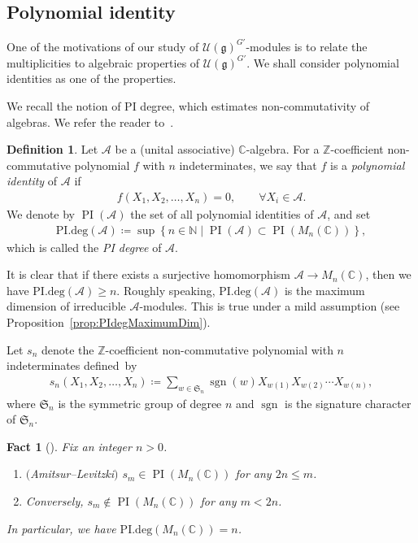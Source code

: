 \documentclass[10pt,a4paper]{amsart}
\numberwithin{equation}{section}
\newtheorem{Fact}[Theorem]{Fact}
\theoremstyle{definition}
\newtheorem{Definition}[Theorem]{Definition}
\newcommand{\set}[1]{\left\{#1 \right\}}
\newcommand{\BasicRing}[1]{\mathbb{#1}}
\newcommand{\ZZ}{\BasicRing{Z}}
\newcommand{\NN}{\BasicRing{N}}
\newcommand{\CC}{\BasicRing{C}}
\newcommand{\PIdeg}{\mathrm{PI.deg}}
\newcommand{\alg}[1]{\mathcal{#1}}
\newcommand{\lieC}[1]{\mathfrak{#1}}
\newcommand{\univ}[1]{\mathcal{U}(\lieC{#1})}
\newcommand{\Sn}{\mathfrak{S}}
\DeclareMathOperator{\PI}{PI}
\DeclareMathOperator{\sgn}{sgn}
\begin{document}
\subsection{Polynomial identity}

One of the motivations of our study of $\univ{g}^{G'}$-modules is to relate the multiplicities to algebraic properties of $\univ{g}^{G'}$.
We shall consider polynomial identities as one of the properties.

We recall the notion of PI degree, which estimates non-commutativity of algebras.
We refer the reader to~\cite[Section~13]{McRo01_noncommutative}.

\begin{Definition}%
	Let $\alg{A}$ be a (unital associative) $\CC$-algebra.
	For a $\ZZ$-coefficient non-commutative polynomial $f$ with $n$ indeterminates, we say that $f$ is a \emph{polynomial identity} of $\alg{A}$ if
	\begin{align*}
		f(X_1, X_2, \ldots, X_n) = 0, \qquad \forall X_i \in \alg{A}.
	\end{align*}
	We denote by $\PI(\alg{A})$ the set of all polynomial identities of $\alg{A}$, and set
	\begin{align*}
		\PIdeg(\alg{A}) \coloneq \sup\set{n \in \NN \mid \PI(\alg{A})\subset \PI(M_n(\CC))},
	\end{align*}
	which is called the \emph{PI degree} of $\alg{A}$.
\end{Definition}

It is clear that if there exists a surjective homomorphism $\alg{A}\rightarrow M_n(\CC)$, then we have $\PIdeg(\alg{A}) \geq n$.
Roughly speaking, $\PIdeg(\alg{A})$ is the maximum dimension of irreducible $\alg{A}$-modules.
This is true under a mild assumption (see Proposition~\ref{prop:PIdegMaximumDim}).

Let $s_n$ denote the $\ZZ$-coefficient non-commutative polynomial with $n$ indeterminates defined~by
\begin{align*}
	s_n(X_1, X_2, \ldots, X_n) \coloneq \sum_{w \in \Sn_n} \sgn(w)X_{w(1)}X_{w(2)}\cdots X_{w(n)},
\end{align*}
where $\Sn_n$ is the symmetric group of degree $n$ and $\sgn$ is the signature character of $\Sn_n$.

\begin{Fact}[{\cite[Proposition~3.2 and Theorem~3.3]{McRo01_noncommutative}}]%
	Fix an integer $n > 0$.
	\begin{enumerate}
		\item[$1.$] $($Amitsur--Levitzki$)$ $s_m \in \PI(M_n(\CC))$ for any $2n\leq m$.
		\item[$2.$] Conversely, $s_m \not\in \PI(M_n(\CC))$ for any $m < 2n$.
	\end{enumerate}
	In particular, we have $\PIdeg(M_n(\CC)) = n$.
\end{Fact}
\end{document}
